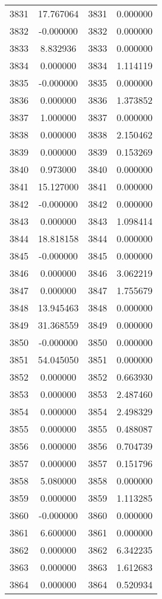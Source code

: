 \documentclass[12pt]{article}
\begin{document}
\begin{longtable}{@{}cccc@{}}
3831 & 17.767064 & 3831 & 0.000000 \\
3832 & -0.000000 & 3832 & 0.000000 \\
3833 & 8.832936 & 3833 & 0.000000 \\
3834 & 0.000000 & 3834 & 1.114119 \\
3835 & -0.000000 & 3835 & 0.000000 \\
3836 & 0.000000 & 3836 & 1.373852 \\
3837 & 1.000000 & 3837 & 0.000000 \\
3838 & 0.000000 & 3838 & 2.150462 \\
3839 & 0.000000 & 3839 & 0.153269 \\
3840 & 0.973000 & 3840 & 0.000000 \\
3841 & 15.127000 & 3841 & 0.000000 \\
3842 & -0.000000 & 3842 & 0.000000 \\
3843 & 0.000000 & 3843 & 1.098414 \\
3844 & 18.818158 & 3844 & 0.000000 \\
3845 & -0.000000 & 3845 & 0.000000 \\
3846 & 0.000000 & 3846 & 3.062219 \\
3847 & 0.000000 & 3847 & 1.755679 \\
3848 & 13.945463 & 3848 & 0.000000 \\
3849 & 31.368559 & 3849 & 0.000000 \\
3850 & -0.000000 & 3850 & 0.000000 \\
3851 & 54.045050 & 3851 & 0.000000 \\
3852 & 0.000000 & 3852 & 0.663930 \\
3853 & 0.000000 & 3853 & 2.487460 \\
3854 & 0.000000 & 3854 & 2.498329 \\
3855 & 0.000000 & 3855 & 0.488087 \\
3856 & 0.000000 & 3856 & 0.704739 \\
3857 & 0.000000 & 3857 & 0.151796 \\
3858 & 5.080000 & 3858 & 0.000000 \\
3859 & 0.000000 & 3859 & 1.113285 \\
3860 & -0.000000 & 3860 & 0.000000 \\
3861 & 6.600000 & 3861 & 0.000000 \\
3862 & 0.000000 & 3862 & 6.342235 \\
3863 & 0.000000 & 3863 & 1.612683 \\
3864 & 0.000000 & 3864 & 0.520934 \\

\end{longtable}
\end{document}
